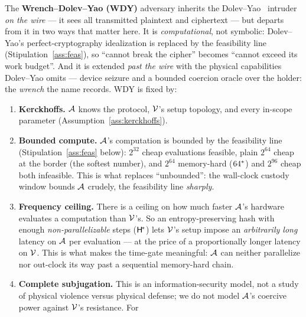\begin{assumption}\label{ass:power}
The \textbf{Wrench--Dolev--Yao (WDY)} adversary inherits the
Dolev--Yao~\cite{dolev-yao} intruder \emph{on the wire} --- it sees all transmitted
plaintext and ciphertext --- but departs from it in two ways that matter here. It is
\emph{computational}, not symbolic: Dolev--Yao's perfect-cryptography idealization is
replaced by the feasibility line (Stipulation~\ref{ass:feas}), so ``cannot break the
cipher'' becomes ``cannot exceed its work budget''. And it is extended \emph{past the
wire} with the physical capabilities Dolev--Yao omits --- device seizure and a bounded
coercion oracle over the holder: the \emph{wrench} the name records. WDY is fixed by:
\begin{enumerate}[nosep,leftmargin=2.4em,start=0,label=\textbf{D\arabic*.},ref=D\arabic*]
  \item\label{d:kerckhoffs} \textbf{Kerckhoffs.} $\mathcal{A}$ knows the protocol,
        $\mathcal{V}$'s setup topology, and every in-scope parameter
        (Assumption~\ref{ass:kerckhoffs}).
  \item\label{d:compute} \textbf{Bounded compute.} $\mathcal{A}$'s computation is bounded by the
        feasibility line (Stipulation~\ref{ass:feas} below): $2^{32}$ cheap
        evaluations feasible, plain $2^{64}$ cheap at the border (the softest
        number), and $2^{64}$ memory-hard ($64^{*}$) and $2^{96}$ cheap both
        infeasible. This is what
        replaces ``unbounded'': the wall-clock custody window bounds
        $\mathcal{A}$ crudely, the feasibility line \emph{sharply}.
  \item\label{d:frequency} \textbf{Frequency ceiling.} There is a ceiling on how much faster
        $\mathcal{A}$'s hardware evaluates a computation than $\mathcal{V}$'s. So an
        entropy-preserving hash with enough \emph{non-parallelizable} steps ($\mathsf{H}^{\!*}$)
        lets $\mathcal{V}$'s setup impose an \emph{arbitrarily long} latency on
        $\mathcal{A}$ per evaluation --- at the price of a proportionally longer
        latency on $\mathcal{V}$. This is what makes the time-gate meaningful:
        $\mathcal{A}$ can neither parallelize nor out-clock its way past a sequential
        memory-hard chain.
  \item\label{d:subjugation} \textbf{Complete subjugation.} This is an information-security model, not
        a study of physical violence versus physical defense; we do not model
        $\mathcal{A}$'s coercive power against $\mathcal{V}$'s resistance. For

\end{enumerate}
\end{assumption}
